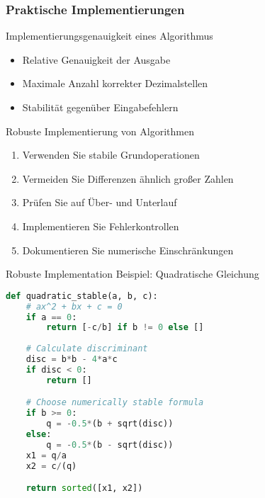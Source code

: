 \subsubsection{Praktische Implementierungen}

\begin{definition}{Implementierungsgenauigkeit eines Algorithmus}
\begin{itemize}
    \item Relative Genauigkeit der Ausgabe
    \item Maximale Anzahl korrekter Dezimalstellen
    \item Stabilität gegenüber Eingabefehlern
\end{itemize}
\end{definition}

\begin{KR}{Robuste Implementierung von Algorithmen}
\begin{enumerate}
    \item Verwenden Sie stabile Grundoperationen
    \item Vermeiden Sie Differenzen ähnlich großer Zahlen
    \item Prüfen Sie auf Über- und Unterlauf
    \item Implementieren Sie Fehlerkontrollen
    \item Dokumentieren Sie numerische Einschränkungen
\end{enumerate}
\end{KR}

\begin{examplecode}{Robuste Implementation} Beispiel: Quadratische Gleichung
\begin{lstlisting}[language=Python, style=basesmol]
def quadratic_stable(a, b, c):
    # ax^2 + bx + c = 0
    if a == 0:
        return [-c/b] if b != 0 else []
        
    # Calculate discriminant
    disc = b*b - 4*a*c
    if disc < 0:
        return []

    # Choose numerically stable formula
    if b >= 0:
        q = -0.5*(b + sqrt(disc))
    else:
        q = -0.5*(b - sqrt(disc))
    x1 = q/a
    x2 = c/(q)

    return sorted([x1, x2])
\end{lstlisting}
\end{examplecode}
